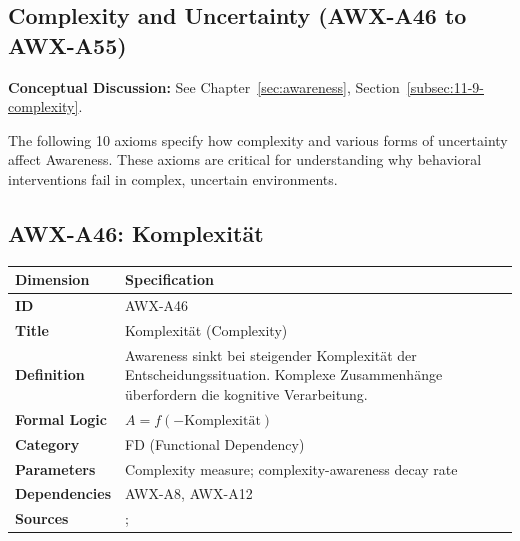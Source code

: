 

\subsection{Complexity and Uncertainty (AWX-A46 to AWX-A55)}

\begin{cross-reference}
\textbf{Conceptual Discussion:} See Chapter~\ref{sec:awareness}, Section~\ref{subsec:11-9-complexity}.
\end{cross-reference}
The following 10 axioms specify how complexity and various forms of uncertainty affect Awareness. These axioms are critical for understanding why behavioral interventions fail in complex, uncertain environments.


\subsection{AWX-A46: Komplexität}

\begin{table}[htbp]
\small
\begin{tabular}{p{3cm}p{11cm}}
\toprule
\textbf{Dimension} & \textbf{Specification} \\
\midrule
\textbf{ID} & AWX-A46 \\
\textbf{Title} & Komplexität (Complexity) \\
\textbf{Definition} & Awareness sinkt bei steigender Komplexität der Entscheidungssituation. Komplexe Zusammenhänge überfordern die kognitive Verarbeitung. \\
\textbf{Formal Logic} & $A = f(-\text{Komplexität})$ \\
\textbf{Category} & FD (Functional Dependency) \\
\textbf{Parameters} & Complexity measure; complexity-awareness decay rate \\
\textbf{Dependencies} & AWX-A8, AWX-A12 \\
\textbf{Sources} & \citet{simon1955behavioral}; \citet{gigerenzer2002bounded} \\
\bottomrule
\end{tabular}
\end{table}

